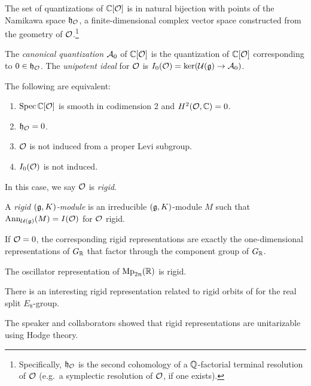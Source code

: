 \documentclass{article}
\begin{document}
\begin{thm}
	The set of quantizations of $\mathbb{C}[\mathcal{O}]$ is in natural bijection with points of the Namikawa space $\mathfrak{h}_{\mathcal{O}}$, a finite-dimensional complex vector space constructed from the geometry of $\mathcal{O}$.\footnote{Specifically, $\mathfrak{h}_{\mathcal{O}}$ is the second cohomology of a $\mathbb{Q}$-factorial terminal resolution of $\mathcal{O}$ (e.g.\ a symplectic resolution of $\mathcal{O}$, if one exists).}
\end{thm}

\begin{dfn}
	The \emph{canonical quantization} $\mathcal{A}_0$ of $\mathbb{C}[\mathcal{O}]$ is the quantization of $\mathbb{C}[\mathcal{O}]$ corresponding to $0 \in \mathfrak{h}_{\mathcal{O}}$.
	The \emph{unipotent ideal} for $\mathcal{O}$ is $I_0(\mathcal{O}) = \ker(\mathcal{U}(\mathfrak{g}) \to \mathcal{A}_0)$.
\end{dfn}

\begin{prop}
	The following are equivalent:
	\begin{enumerate}
		\item $\operatorname{Spec} \mathbb{C}[\mathcal{O}]$ is smooth in codimension 2 and $H^2(\mathcal{O}, \mathbb{C}) = 0$.
		\item $\mathfrak{h}_{\mathcal{O}} = 0$.
		\item $\mathcal{O}$ is not induced from a proper Levi subgroup.
		\item $I_0(\mathcal{O})$ is not induced.
	\end{enumerate}
\end{prop}

In this case, we say $\mathcal{O}$ is \emph{rigid}.

\begin{dfn}
	A \emph{rigid $(\mathfrak{g}, K)$-module} is an irreducible $(\mathfrak{g}, K)$-module $M$ such that $\operatorname{Ann}_{\mathcal{U}(\mathfrak{g})}(M) = I(\mathcal{O})$ for $\mathcal{O}$ rigid.
\end{dfn}

\begin{ex}
	If $\mathcal{O} = 0$, the corresponding rigid representations are exactly the one-dimensional representations of $G_{\mathbb{R}}$ that factor through the component group of $G_{\mathbb{R}}$.
\end{ex}

\begin{ex}
	The oscillator representation of $\operatorname{Mp}_{2n}(\mathbb{R})$ is rigid.
\end{ex}

\begin{ex}
	There is an interesting rigid representation related to rigid orbits of for the real split $E_8$-group.
\end{ex}

The speaker and collaborators showed that rigid representations are unitarizable using Hodge theory.
\end{document}

